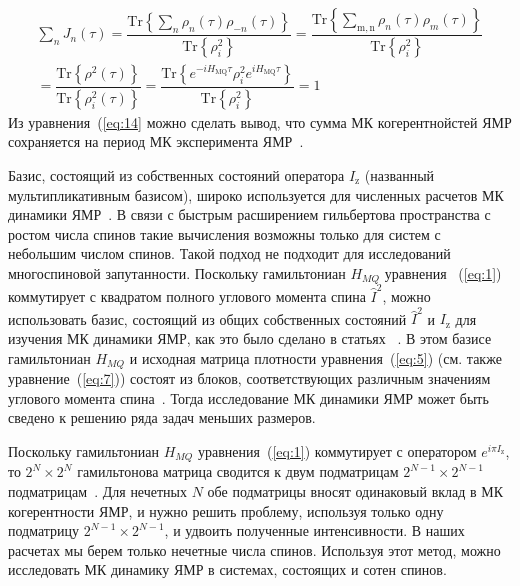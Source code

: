 \documentclass[utf8]{jetp}
\begin{document}
%
\begin{multline}
    \label{eq:14}
    \sum\limits_{n} J_{n}(\tau)
    = \dfrac{
        \mathrm{Tr} \left\{
            \sum_{n} \rho_{n}(\tau) \rho_{-n}(\tau)
        \right\}}
    {\mathrm{Tr} \left\{ \rho^2_{i} \right\}} 
    = \dfrac{
        \mathrm{Tr} \left\{
            \sum_{\mathrm{m,n}} \rho_n(\tau)\rho_m(\tau)
    \right\}}
    {\mathrm{Tr} \left\{\rho^2_{i}\right\}}
    \\
    = \dfrac{
        \mathrm{Tr}\left\{\rho^2(\tau)\right\}
    }
    {
        \mathrm{Tr}\left\{\rho^2_{i}(\tau)\right\}
    }
    = \dfrac{
        \mathrm{Tr} \left\{ 
            e^{-i H_\mathrm{MQ} \tau} 
            \rho^{2}_{i}
            e^{i H_\mathrm{MQ} \tau} 
        \right\}
    }
    {
        \mathrm{Tr} \left\{ \rho_{i}^{2} \right\}
    } 
    = 1
\end{multline}
%
Из уравнения~(\ref{eq:14} можно сделать вывод, что сумма МК когерентнойстей ЯМР сохраняется на период МК эксперимента ЯМР~\cite{Baum_1985}.

Базис, состоящий из собственных состояний оператора $I_\mathrm{z}$ (названный мультипликативным базисом), широко используется для численных расчетов МК динамики ЯМР~\cite{Zhang_2009}.
В связи с быстрым расширением гильбертова пространства с ростом числа спинов такие вычисления возможны только для систем с небольшим числом спинов.
Такой подход не подходит для исследований многоспиновой запутанности.
Поскольку гамильтониан $H_{MQ}$ уравнения ~(\ref{eq:1}) коммутирует с квадратом полного углового момента спина $\hat I^2$, 
можно использовать базис, состоящий из общих собственных состояний $\hat I^2$ и $I_\mathrm{z}$ для изучения МК динамики ЯМР, как это было сделано в статьях ~\cite{Doronin_2009,Doronin_2011,Doronin_2019}.
В этом базисе гамильтониан $H_{MQ}$ и исходная матрица плотности уравнения~(\ref{eq:5}) (см. также уравнение~(\ref{eq:7})) состоят из блоков, соответствующих различным значениям углового момента спина~\cite{Doronin_2009}.
Тогда исследование МК динамики ЯМР может быть сведено к решению ряда задач меньших размеров.

Поскольку гамильтониан $H_{MQ}$ уравнения~(\ref{eq:1}) коммутирует с оператором $e^{i\pi I_\mathrm{z}}$, то $2^N \times 2^N$ гамильтонова матрица сводится к двум подматрицам $2^{N-1} \times 2^{N-1}$ подматрицам~\cite{Doronin_2009}.
Для нечетных $N$ обе подматрицы вносят одинаковый вклад в МК когерентности ЯМР, и нужно решить проблему, используя только одну подматрицу $2^{N-1} \times 2^{N-1}$, и удвоить полученные интенсивности.
В наших расчетах мы берем только нечетные числа спинов.
Используя этот метод, можно исследовать МК динамику ЯМР в системах, состоящих и сотен спинов.
\end{document}
